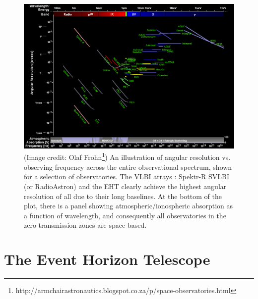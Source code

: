 {%
\begin{figure}[h!]
\includegraphics[width=\columnwidth]{Images/spec_ang}
\caption{(Image credit: Olaf Frohn\protect\footnote{http://armchairastronautics.blogspot.co.za/p/space-observatories.html}) An illustration of angular resolution vs. observing frequency across the entire observational spectrum, shown for a selection of observatories. The VLBI arrays : Spektr-R SVLBI (or RadioAstron) and the EHT clearly achieve the highest angular resolution of all due to their long baselines. At the bottom of the plot, there is a panel showing atmospheric/ionospheric absorption as a function of wavelength, and consequently all observatories in the zero transmission zones are space-based. \label{fig:spec_ang}
}
\end{figure}

\section{The Event Horizon Telescope}
}
